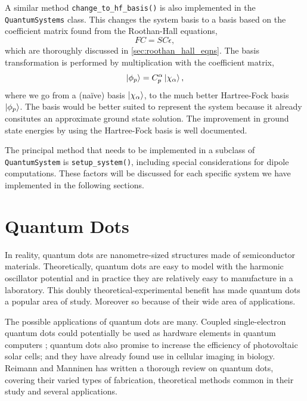 A similar method \lstinline{change_to_hf_basis()} is also implemented in the 
\lstinline{QuantumSystems} class. This changes the system basis to a basis based 
on the coefficient matrix found from the Roothan-Hall equations,
\begin{equation}
    FC = SC\epsilon,
\end{equation}
which are thoroughly discussed in \autoref{sec:roothan_hall_eqns}.
The basis transformation is performed by multiplication with the coefficient matrix,
\begin{equation}
    \ket{\phi_p} = C^\alpha_p \ket{\chi_\alpha},
\end{equation}
where we go from a (naïve) basis $\ket{\chi_\alpha}$, to the much better Hartree-Fock basis 
$\ket{\phi_p}$. The basis would be better suited to represent the system because it 
already consitutes an approximate ground state solution. The improvement in ground state 
energies by using the Hartree-Fock basis is well
documented\cite{jorgensen2011many,lohne2010coupled}.

The principal method that needs to be implemented in a subclass of
\lstinline{QuantumSystem} is
\lstinline{setup_system()}, including special considerations for dipole computations.
These factors will be discussed for each specific system we have implemented in the 
following sections.

\section{Quantum Dots}

In reality, quantum dots are nanometre-sized structures made of semiconductor materials.
Theoretically, quantum dots are easy to model with the harmonic oscillator potential and 
in practice
they are relatively easy to manufacture in a laboratory. This doubly
theoretical-experimental benefit has made quantum dots a popular area of study. Moreover so 
because of their wide area of applications.

The possible applications of quantum dots are many. Coupled single-electron quantum dots 
could potentially be used as hardware elements in quantum computers \cite{loss1998quantum}; quantum dots also promise to increase the efficiency of 
photovoltaic solar cells; and they have already found use in cellular imaging in biology.
Reimann and Manninen \cite{reimann2002electronic} has written a
thorough review on quantum dots, covering their varied types of fabrication, theoretical
methods common in their study and several applications.

